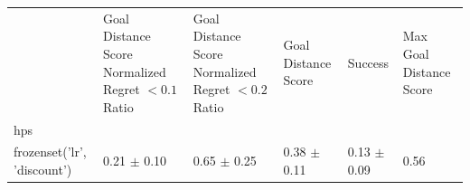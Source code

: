 \begin{tabular}{llllll}
\toprule
 & Goal Distance Score Normalized Regret $< 0.1$ Ratio & Goal Distance Score Normalized Regret $< 0.2$ Ratio & Goal Distance Score & Success & Max Goal Distance Score \\
hps &  &  &  &  &  \\
\midrule
frozenset({'lr', 'discount'}) & 0.21 $\pm$ 0.10 & 0.65 $\pm$ 0.25 & 0.38 $\pm$ 0.11 & 0.13 $\pm$ 0.09 & 0.56 \\
\bottomrule
\end{tabular}

